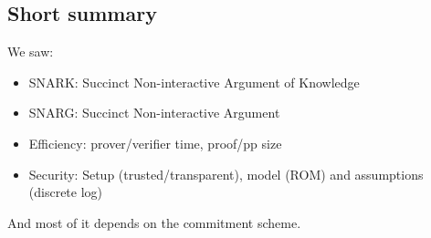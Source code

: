   \subsection{Short summary}
  We saw:
  \begin{itemize}
    \item SNARK: Succinct Non-interactive Argument of Knowledge 
    \item SNARG: Succinct Non-interactive Argument
    \item Efficiency: prover/verifier time, proof/pp size 
    \item Security: Setup (trusted/transparent), model (ROM) and assumptions (discrete log)
  \end{itemize}
  And most of it depends on the commitment scheme.

